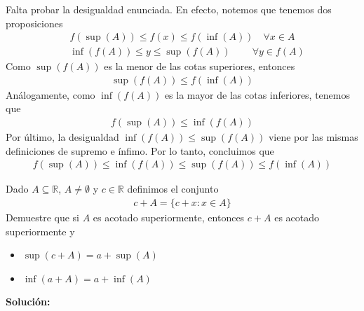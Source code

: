 \documentclass[12pt]{book}
\begin{document}
Falta probar la desigualdad enunciada. En efecto, notemos que tenemos dos proposiciones
\begin{align*}
    f(\sup(A)) \leq f(x) \leq f(\inf(A)) \quad \forall x \in A
\end{align*}
\begin{align*}
   \quad \inf(f(A)) \leq y \leq \sup(f(A))  \quad  \ \quad \forall y \in f(A)
\end{align*}
Como $\sup(f(A))$ es la menor de las cotas superiores, entonces 
\begin{align*}
    \sup(f(A)) \leq f(\inf(A))
\end{align*}
Análogamente, como $\inf(f(A))$ es la mayor de las cotas inferiores, tenemos que 
\begin{align*}
    f(\sup(A)) \leq \inf(f(A))
\end{align*}
Por último, la desigualdad $\inf(f(A)) \leq \sup(f(A))$ viene por las mismas definiciones de supremo e ínfimo. Por lo tanto, concluimos que
\begin{align*}
    f(\sup(A))\leq \inf(f(A)) \leq \sup(f(A)) \leq f(\inf(A))
\end{align*}
\begin{prob}{}{}
    Dado $A \subseteq \mathbb{R}$, $A \neq \emptyset$ y $c \in \mathbb{R}$ definimos el conjunto 
    \begin{align*}
        c+A=\{c+x : x \in A\}
    \end{align*}
    Demuestre que si $A$ es acotado superiormente, entonces $c+ A$ es acotado superiormente y 
\begin{itemize}
    \item[\textbf{a)}] $\sup(c+A)=a+\sup(A)$
    \item[\textbf{b)}] $\inf(a+A)=a+\inf(A)$
\end{itemize}
\end{prob}
\textbf{Solución:}
\end{document}
